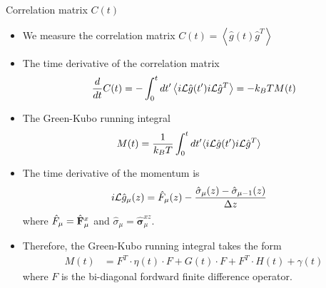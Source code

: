\documentclass{beamer}
\newcommand{\esc}{\!\cdot\!}
\newcommand{\llangle}{\left\langle}
\newcommand{\rrangle}{\right\rangle}
\begin{document}
\begin{frame}{Correlation matrix $C(t)$}
  \begin{itemize}
    \item We measure the correlation matrix $C(t)=\llangle \hat{g}(t) \hat{g}^T \rrangle$
\item  The time derivative of the correlation matrix
\begin{align}
  \frac{d}{dt}C(t)
=-  \int_0^t dt' \llangle i{\cal L}\hat{g}(t') i{\cal L}\hat{g}^T\rrangle
=-  k_BT M(t)
\nonumber
\end{align}
\item The Green-Kubo running integral 
\begin{align}
M(t)&= \frac{1}{k_BT}\int_0^t dt'\langle i{\cal L}\hat{g}(t')i{\cal L} \hat{g}^T\rangle
\nonumber
\end{align}
\item The time derivative of the momentum is 
\begin{align}
  i{\cal L}\hat{g}_\mu(z) &=\hat{F}_\mu(z)-\frac{\hat{\sigma}_\mu(z)-\hat{\sigma}_{\mu-1}(z)}{\Delta z}
\nonumber
\end{align}
where
$\hat{F}_\mu=\hat{\bf                   F}_\mu^x$                  and
$\hat{\sigma}_\mu=\hat{\boldsymbol{\sigma}}^{xz}_\mu$.
\item Therefore, the Green-Kubo running integral takes the form  
\begin{align}
{M}(t)&=F^T\esc{\eta}(t)\esc F+{G}(t)\esc F+F^T\esc{H}(t)+{\gamma}(t)
\nonumber
\end{align}
where $F$ is the bi-diagonal fordward finite difference operator.
  \end{itemize}
\end{frame}
\end{document}
